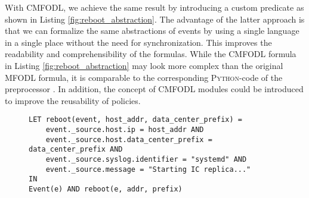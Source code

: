 With CMFODL, we achieve the same result by introducing a custom predicate as shown in Listing \ref{fig:reboot_abstraction}. The advantage of the latter approach is that we can formalize the same abstractions of events by using a single language in a single place without the need for synchronization. This improves the readability and comprehensibility of the formulas. While the CMFODL formula in Listing \ref{fig:reboot_abstraction} may look more complex than the original MFODL formula, it is comparable to the corresponding \textsc{Python}-code of the preprocessor \cite{IcPolicymonitoringMaster}. In addition, the concept of CMFODL modules could be introduced to improve the reusability of policies.

\begin{figure}
	\begin{lstlisting}[style=formula,caption=CMFODL formula abstracting a reboot event, label=fig:reboot_abstraction]
LET reboot(event, host_addr, data_center_prefix) =
	event._source.host.ip = host_addr AND
	event._source.host.data_center_prefix = data_center_prefix AND
	event._source.syslog.identifier = "systemd" AND
	event._source.message = "Starting IC replica..."
IN
Event(e) AND reboot(e, addr, prefix)\end{lstlisting}
\end{figure}

